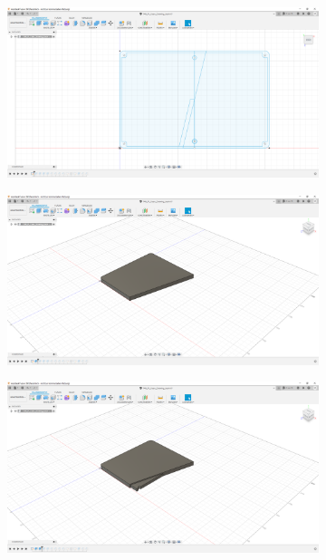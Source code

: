 \begin{figure}[h!tb]
	\begin{subfigure}[t]{.3\linewidth}
		\includegraphics[width=\linewidth]{img/konstruktion_gehaeuse_hinten_001.png}
		\caption[]{}
		\label{fig:design-back-01}
	\end{subfigure}	
	\begin{subfigure}[t]{.3\linewidth}
		\includegraphics[width=\linewidth]{img/konstruktion_gehaeuse_hinten_002.png}
		\caption[]{}
		\label{fig:design-back-02}
	\end{subfigure}
	\begin{subfigure}[t]{.3\linewidth}
		\includegraphics[width=\linewidth]{img/konstruktion_gehaeuse_hinten_003.png}

\end{subfigure}
\end{figure}
